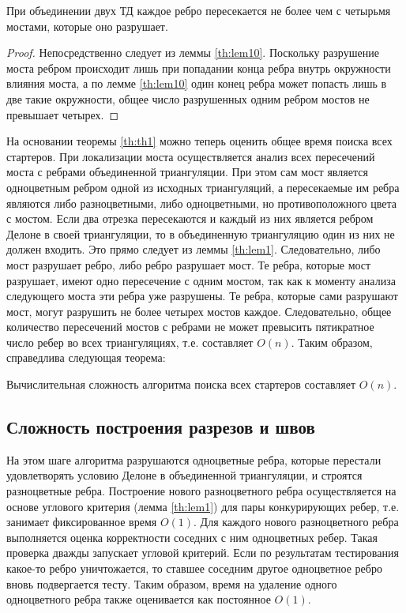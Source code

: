 \documentclass[12pt]{article}
\begin{document}
\begin{theorem}
\label{th:th1}
При объединении двух ТД каждое ребро пересекается не более чем с четырьмя мостами, которые оно разрушает. 
\end{theorem}

\begin{proof}
Непосредственно следует из леммы \ref{th:lem10}.
Поскольку разрушение моста ребром происходит лишь при попадании конца ребра внутрь окружности влияния моста,
а по лемме \ref{th:lem10} один конец ребра может попасть лишь в две такие окружности,
общее число разрушенных одним ребром мостов не превышает четырех.
\end{proof}

На основании теоремы \ref{th:th1} можно теперь оценить общее время поиска всех стартеров.
При локализации моста осуществляется анализ всех пересечений моста с ребрами объединенной триангуляции.
При этом сам мост является одноцветным ребром одной из исходных триангуляций,
а пересекаемые им ребра являются либо разноцветными, либо одноцветными, но противоположного цвета с мостом.
Если два отрезка пересекаются и каждый из них является ребром Делоне в своей триангуляции, то в объединенную триангуляцию один из них не должен входить. Это прямо следует из леммы \ref{th:lem1}.
Следовательно, либо мост разрушает ребро, либо ребро разрушает мост.
Те ребра, которые мост разрушает, имеют одно пересечение с одним мостом, так как к моменту анализа следующего моста эти ребра уже разрушены.
Те ребра, которые сами разрушают мост, могут разрушить не более четырех мостов каждое.
Следовательно, общее количество пересечений мостов с ребрами не может превысить пятикратное число ребер во всех триангуляциях, т.е. составляет $O(n)$. Таким образом, справедлива следующая теорема:

\begin{theorem}
\label{th:th2}
Вычислительная сложность алгоритма поиска всех стартеров составляет $O(n)$.
\end{theorem}

\subsection{Сложность построения разрезов и швов}
На этом шаге алгоритма разрушаются одноцветные ребра,
которые перестали удовлетворять условию Делоне в объединенной триангуляции,
и строятся разноцветные ребра.
Построение нового разноцветного ребра осуществляется на основе углового критерия (лемма \ref{th:lem1}) для пары конкурирующих ребер,
т.е. занимает фиксированное время $O(1)$.
Для каждого нового разноцветного ребра выполняется оценка корректности соседних с ним одноцветных ребер.
Такая проверка дважды запускает угловой критерий.
Если по результатам тестирования какое-то ребро уничтожается, то ставшее соседним другое одноцветное ребро вновь подвергается тесту.
Таким образом, время на удаление одного одноцветного ребра также оценивается как постоянное $O(1)$.
\end{document}
